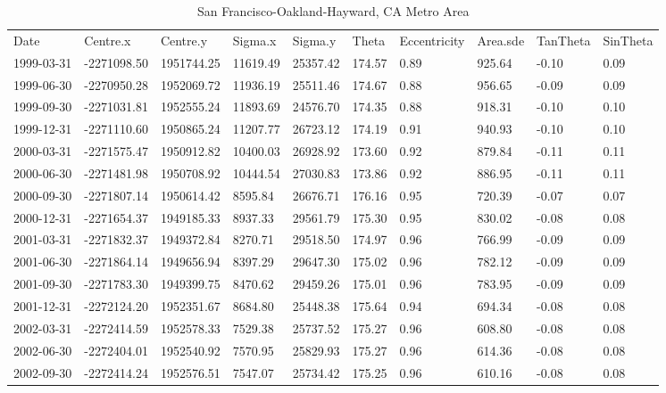 \begin{landscape}
\singlespacing
\small
\centering
\begin{longtable}{llllllllll}
\caption{San Francisco-Oakland-Hayward, CA Metro Area} 
\endfirsthead
\caption{San Francisco-Oakland-Hayward, CA Metro Area} 
\endhead
\label{tab:SF_SE} 
Date       & Centre.x   & Centre.y   & Sigma.x  & Sigma.y  & Theta  & Eccentricity & Area.sde & TanTheta & SinTheta \\

1999-03-31 & -2271098.50 & 1951744.25 & 11619.49 & 25357.42 & 174.57 & 0.89 & 925.64  & -0.10 & 0.09 \\
1999-06-30 & -2270950.28 & 1952069.72 & 11936.19 & 25511.46 & 174.67 & 0.88 & 956.65  & -0.09 & 0.09 \\
1999-09-30 & -2271031.81 & 1952555.24 & 11893.69 & 24576.70 & 174.35 & 0.88 & 918.31  & -0.10 & 0.10 \\
1999-12-31 & -2271110.60 & 1950865.24 & 11207.77 & 26723.12 & 174.19 & 0.91 & 940.93  & -0.10 & 0.10 \\
2000-03-31 & -2271575.47 & 1950912.82 & 10400.03 & 26928.92 & 173.60 & 0.92 & 879.84  & -0.11 & 0.11 \\
2000-06-30 & -2271481.98 & 1950708.92 & 10444.54 & 27030.83 & 173.86 & 0.92 & 886.95  & -0.11 & 0.11 \\
2000-09-30 & -2271807.14 & 1950614.42 & 8595.84  & 26676.71 & 176.16 & 0.95 & 720.39  & -0.07 & 0.07 \\
2000-12-31 & -2271654.37 & 1949185.33 & 8937.33  & 29561.79 & 175.30 & 0.95 & 830.02  & -0.08 & 0.08 \\
2001-03-31 & -2271832.37 & 1949372.84 & 8270.71  & 29518.50 & 174.97 & 0.96 & 766.99  & -0.09 & 0.09 \\
2001-06-30 & -2271864.14 & 1949656.94 & 8397.29  & 29647.30 & 175.02 & 0.96 & 782.12  & -0.09 & 0.09 \\
2001-09-30 & -2271783.30 & 1949399.75 & 8470.62  & 29459.26 & 175.01 & 0.96 & 783.95  & -0.09 & 0.09 \\
2001-12-31 & -2272124.20 & 1952351.67 & 8684.80  & 25448.38 & 175.64 & 0.94 & 694.34  & -0.08 & 0.08 \\
2002-03-31 & -2272414.59 & 1952578.33 & 7529.38  & 25737.52 & 175.27 & 0.96 & 608.80  & -0.08 & 0.08 \\
2002-06-30 & -2272404.01 & 1952540.92 & 7570.95  & 25829.93 & 175.27 & 0.96 & 614.36  & -0.08 & 0.08 \\
2002-09-30 & -2272414.24 & 1952576.51 & 7547.07  & 25734.42 & 175.25 & 0.96 & 610.16  & -0.08 & 0.08 \\

\end{longtable}
\end{landscape}
